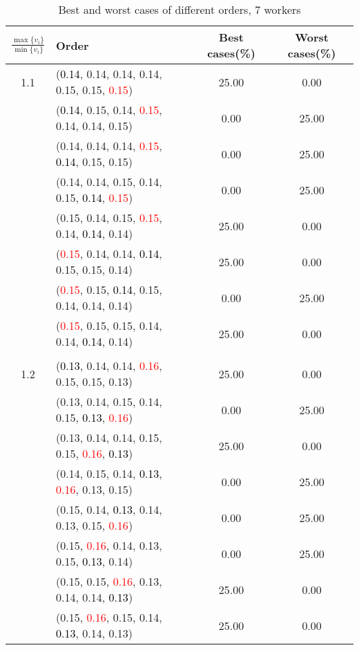 \documentclass[10pt,a4paper]{report}
\begin{document}
\newpage\begin{center}
	\small
	\begin{longtable}{clcc}
		\caption{Best and worst cases of different orders, 7 workers}\\
		\toprule
		\setlength{\tabcolsep}{1mm}
		\renewcommand\baselinestretch{0.5}\selectfont
		$\frac{\max\{v_i\}}{\min\{v_i\}}$ & Order & Best cases(\%) & Worst cases(\%) \\
			\midrule		1.1			&(\textcolor{black}{0.14}, 0.14, 0.14, 0.14, 0.15, 0.15, \textcolor{red}{0.15})&25.00&0.00\\
			&(\textcolor{black}{0.14}, 0.15, 0.14, \textcolor{red}{0.15}, 0.14, 0.14, 0.15)&0.00&25.00\\
			&(0.14, 0.14, 0.14, \textcolor{red}{0.15}, \textcolor{black}{0.14}, 0.15, 0.15)&0.00&25.00\\
			&(0.14, 0.14, 0.15, 0.14, 0.15, \textcolor{black}{0.14}, \textcolor{red}{0.15})&0.00&25.00\\
			&(0.15, 0.14, 0.15, \textcolor{red}{0.15}, 0.14, \textcolor{black}{0.14}, 0.14)&25.00&0.00\\
			&(\textcolor{red}{0.15}, 0.14, 0.14, \textcolor{black}{0.14}, 0.15, 0.15, 0.14)&25.00&0.00\\
			&(\textcolor{red}{0.15}, 0.15, \textcolor{black}{0.14}, 0.15, 0.14, 0.14, 0.14)&0.00&25.00\\
			&(\textcolor{red}{0.15}, 0.15, 0.15, 0.14, 0.14, \textcolor{black}{0.14}, 0.14)&25.00&0.00\\
		&&&\\
		1.2			&(\textcolor{black}{0.13}, 0.14, 0.14, \textcolor{red}{0.16}, 0.15, 0.15, 0.13)&25.00&0.00\\
			&(0.13, 0.14, 0.15, 0.14, 0.15, \textcolor{black}{0.13}, \textcolor{red}{0.16})&0.00&25.00\\
			&(0.13, 0.14, 0.14, 0.15, 0.15, \textcolor{red}{0.16}, \textcolor{black}{0.13})&25.00&0.00\\
			&(0.14, 0.15, 0.14, \textcolor{black}{0.13}, \textcolor{red}{0.16}, 0.13, 0.15)&0.00&25.00\\
			&(0.15, 0.14, \textcolor{black}{0.13}, 0.14, 0.13, 0.15, \textcolor{red}{0.16})&0.00&25.00\\
			&(0.15, \textcolor{red}{0.16}, 0.14, 0.13, 0.15, \textcolor{black}{0.13}, 0.14)&0.00&25.00\\
			&(0.15, 0.15, \textcolor{red}{0.16}, 0.13, 0.14, 0.14, \textcolor{black}{0.13})&25.00&0.00\\
			&(0.15, \textcolor{red}{0.16}, 0.15, 0.14, \textcolor{black}{0.13}, 0.14, 0.13)&25.00&0.00\\

\end{longtable}
\end{center}
\end{document}
